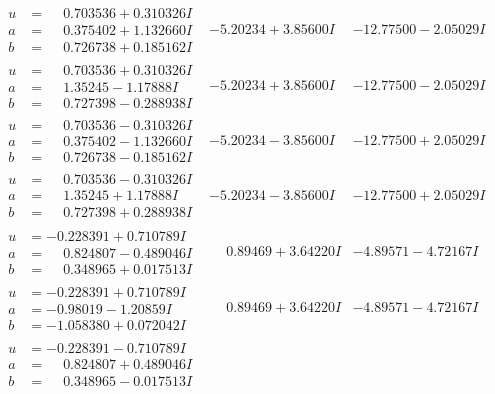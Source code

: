 \documentclass[1p]{elsarticle_modified}
\theoremstyle{definition}
\begin{document}
$$\begin{array}{c|c|c}
\begin{aligned}
u &= \phantom{-}0.703536 + 0.310326 I \\
a &= \phantom{-}0.375402 + 1.132660 I \\
b &= \phantom{-}0.726738 + 0.185162 I\end{aligned}
 & -5.20234 + 3.85600 I & -12.77500 - 2.05029 I \\ \hline\begin{aligned}
u &= \phantom{-}0.703536 + 0.310326 I \\
a &= \phantom{-}1.35245 - 1.17888 I \\
b &= \phantom{-}0.727398 - 0.288938 I\end{aligned}
 & -5.20234 + 3.85600 I & -12.77500 - 2.05029 I \\ \hline\begin{aligned}
u &= \phantom{-}0.703536 - 0.310326 I \\
a &= \phantom{-}0.375402 - 1.132660 I \\
b &= \phantom{-}0.726738 - 0.185162 I\end{aligned}
 & -5.20234 - 3.85600 I & -12.77500 + 2.05029 I \\ \hline\begin{aligned}
u &= \phantom{-}0.703536 - 0.310326 I \\
a &= \phantom{-}1.35245 + 1.17888 I \\
b &= \phantom{-}0.727398 + 0.288938 I\end{aligned}
 & -5.20234 - 3.85600 I & -12.77500 + 2.05029 I \\ \hline\begin{aligned}
u &= -0.228391 + 0.710789 I \\
a &= \phantom{-}0.824807 - 0.489046 I \\
b &= \phantom{-}0.348965 + 0.017513 I\end{aligned}
 & \phantom{-}0.89469 + 3.64220 I & -4.89571 - 4.72167 I \\ \hline\begin{aligned}
u &= -0.228391 + 0.710789 I \\
a &= -0.98019 - 1.20859 I \\
b &= -1.058380 + 0.072042 I\end{aligned}
 & \phantom{-}0.89469 + 3.64220 I & -4.89571 - 4.72167 I \\ \hline\begin{aligned}
u &= -0.228391 - 0.710789 I \\
a &= \phantom{-}0.824807 + 0.489046 I \\
b &= \phantom{-}0.348965 - 0.017513 I\end{aligned}

\end{array}$$
\end{document}
